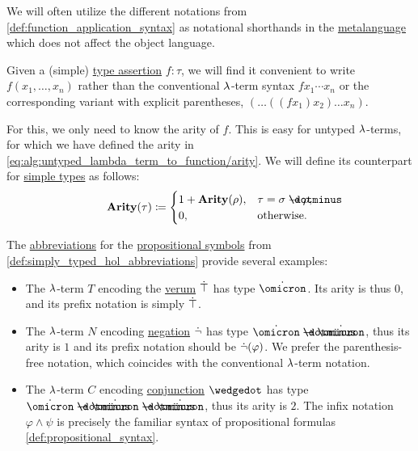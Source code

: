 \begin{remark}\label{rem:simple_type_function_syntax}
  We will often utilize the different notations from \cref{def:function_application_syntax} as notational shorthands in the \hyperref[con:metalogic]{metalanguage} which does not affect the object language.

  Given a (simple) \hyperref[con:type_annotation]{type assertion} \( f: \tau \), we will find it convenient to write \( f(x_1, \ldots, x_n) \) rather than the conventional \( {\mathrm \lambda} \)-term syntax \( f x_1 \cdots x_n \) or the corresponding variant with explicit parentheses, \( (\ldots ((f x_1) x_2) \ldots x_n) \).

  For this, we only need to know the arity of \( f \). This is easy for untyped \( {\mathrm \lambda} \)-terms, for which we have defined the arity in \eqref{eq:alg:untyped_lambda_term_to_function/arity}. We will define its counterpart for \hyperref[def:simple_type]{simple types} as follows:
  \begin{equation*}
    \op*{Arity}(\tau) \coloneqq \begin{cases}
      1 + \op*{Arity}(\rho), &\tau = \sigma \synimplies \rho, \\
      0,                     &\T{otherwise.}
    \end{cases}
  \end{equation*}

  The \hyperref[con:metalingual_abbreviation]{abbreviations} for the \hyperref[def:propositional_alphabet]{propositional symbols} from \cref{def:simply_typed_hol_abbreviations} provide several examples:
  \begin{itemize}
    \item The \( {\mathrm \lambda} \)-term \( T \) encoding the \hyperref[def:propositional_alphabet/constants/verum]{verum} \( \dot{\top} \) has type \( \syn\omicron \). Its arity is thus \( 0 \), and its prefix notation is simply \( \dot{\top} \).

    \item The \( {\mathrm \lambda} \)-term \( N \) encoding \hyperref[def:propositional_alphabet/negation]{negation} \( \dot{\neg} \) has type \( \syn\omicron \synimplies \syn\omicron \), thus its arity is \( 1 \) and its prefix notation should be \( \dot{\neg}(\varphi) \). We prefer the parenthesis-free notation, which coincides with the conventional \( {\mathrm \lambda} \)-term notation.

    \item The \( {\mathrm \lambda} \)-term \( C \) encoding \hyperref[def:propositional_alphabet/connectives/conjunction]{conjunction} \( \synwedge \) has type \( \syn\omicron \synimplies \syn\omicron \synimplies \syn\omicron \), thus its arity is \( 2 \). The infix notation \( \varphi \wedge \psi \) is precisely the familiar syntax of propositional formulas \cref{def:propositional_syntax}.


\end{itemize}
\end{remark}
